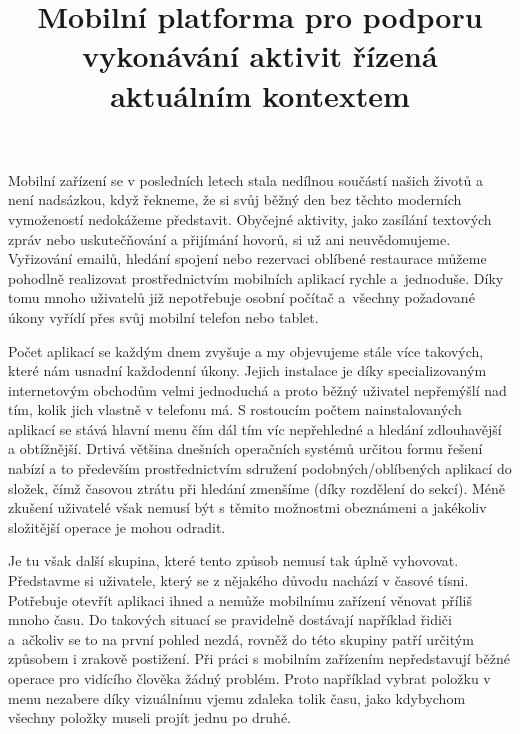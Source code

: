 \documentclass[thesis=M,czech]{FITthesis}[2012/06/26]
\title{Mobilní platforma pro podporu vykonávání aktivit řízená aktuálním kontextem}
\begin{document}


\begin{introduction}
Mobilní zařízení se v posledních letech stala nedílnou součástí našich životů a není nadsázkou, když řekneme, že si svůj běžný den bez těchto moderních vymožeností nedokážeme představit. Obyčejné aktivity, jako zasílání textových zpráv nebo uskutečňování a přijímání hovorů, si už ani neuvědomujeme. Vyřizování emailů, hledání spojení nebo rezervaci oblíbené restaurace můžeme pohodlně realizovat prostřednictvím mobilních aplikací rychle a~jednoduše. Díky tomu mnoho uživatelů již nepotřebuje osobní počítač a~všechny požadované úkony vyřídí přes svůj mobilní telefon nebo tablet.

Počet aplikací se každým dnem zvyšuje a my objevujeme stále více takových, které nám usnadní každodenní úkony. Jejich instalace je díky specializovaným internetovým obchodům velmi jednoduchá a proto běžný uživatel nepřemýšlí nad tím, kolik jich vlastně v telefonu má. S rostoucím počtem nainstalovaných aplikací se stává hlavní menu čím dál tím víc nepřehledné a hledání zdlouhavější a obtížnější. Drtivá většina dnešních operačních systémů určitou formu řešení nabízí a to především prostřednictvím sdružení podobných/oblíbených aplikací do složek, čímž časovou ztrátu při hledání zmenšíme (díky rozdělení do sekcí). Méně zkušení uživatelé však nemusí být s těmito možnostmi obeznámeni a jakékoliv složitější operace je mohou odradit.

Je tu však další skupina, které tento způsob nemusí tak úplně vyhovovat. Představme si uživatele, který se z nějakého důvodu nachází v časové tísni. Potřebuje otevřít aplikaci ihned a nemůže mobilnímu zařízení věnovat příliš mnoho času. Do takových situací se pravidelně dostávají například řidiči a~ačkoliv se to na první pohled nezdá, rovněž do této skupiny patří určitým způsobem i zrakově postižení. Při práci s mobilním zařízením nepředstavují běžné operace pro vidícího člověka žádný problém. Proto například vybrat položku v menu nezabere díky vizuálnímu vjemu zdaleka tolik času, jako kdybychom všechny položky museli projít jednu po druhé.


\end{introduction}
\end{document}
